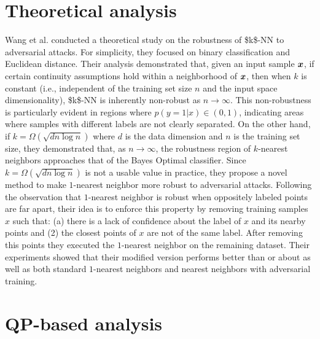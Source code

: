 \section {Theoretical analysis}
\label{sec:theory-analysis}
Wang et al. \cite{WangJC18} conducted a theoretical study on the robustness of \acs{$k$-NN} to adversarial attacks. For simplicity, they focused on binary classification and Euclidean distance. Their analysis demonstrated that, given an input sample $\bm{x}$, if certain continuity assumptions hold within a neighborhood of $\bm{x}$, then when $k$ is constant (i.e., independent of the training set size $n$ and the input space dimensionality), \acs{$k$-NN}  is inherently non-robust as $n \rightarrow \infty $. This non-robustness is particularly evident in regions where  $p(y=1 | x) \in (0,1)$, indicating areas where samples with different labels are not clearly separated. On the other hand, if $k = \Omega(\sqrt{dn \log n})$ where $d$ is the data dimension and $n$ is the training set size, they demonstrated that, as $n \rightarrow \infty $, the robustness region of $k$-nearest neighbors approaches that of the Bayes Optimal classifier. Since $k = \Omega(\sqrt{dn \log n})$ is not a usable value in practice, they propose a novel method to make $1$-nearest neighbor more robust to adversarial attacks. Following the observation that $1$-nearest neighbor is robust when oppositely labeled points are far apart, their idea is to enforce this property by removing training samples $x$ such that: (a) there is a lack of confidence about the label of $x$ and its nearby points and (2) the closest points of $x$ are not of the same label. After removing this points they executed the $1$-nearest neighbor on the remaining dataset. Their experiments showed that their modified version performs better than or about as well as both standard $1$-nearest neighbors and nearest neighbors with adversarial training.

\section {\acs{QP}-based analysis}
\label{sec:qp-analysis}

